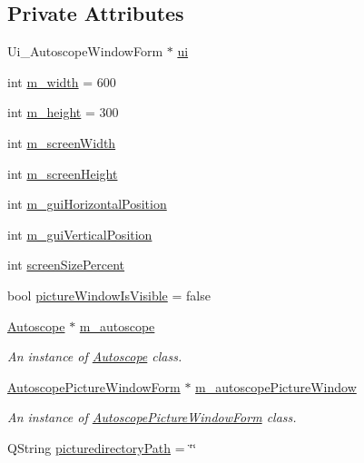 \subsection*{Private Attributes}
\begin{DoxyCompactItemize}
\item 
Ui\+\_\+\+Autoscope\+Window\+Form $\ast$ \mbox{\hyperlink{class_autoscope_window_form_a9a937e00b0a9a4d16001b5da7449a07f}{ui}}
\item 
int \mbox{\hyperlink{class_autoscope_window_form_a494735b51d06bfa71d5954da50f51d3d}{m\+\_\+width}} = 600
\item 
int \mbox{\hyperlink{class_autoscope_window_form_a6dbb17c9dce12f2a8775e1510b0139e9}{m\+\_\+height}} = 300
\item 
int \mbox{\hyperlink{class_autoscope_window_form_a6a4204832945288b420ae248dc69ae08}{m\+\_\+screen\+Width}}
\item 
int \mbox{\hyperlink{class_autoscope_window_form_a60c88c0b6f8f7f5eac46680a7b00b59e}{m\+\_\+screen\+Height}}
\item 
int \mbox{\hyperlink{class_autoscope_window_form_a729b0f3174ac22f142a78dbc6d2677be}{m\+\_\+gui\+Horizontal\+Position}}
\item 
int \mbox{\hyperlink{class_autoscope_window_form_abfd03b3848ab390f59cfe1778595bcb8}{m\+\_\+gui\+Vertical\+Position}}
\item 
int \mbox{\hyperlink{class_autoscope_window_form_a4e436f5aca95b4d503ae9c5fe28ec8ed}{screen\+Size\+Percent}}
\item 
bool \mbox{\hyperlink{class_autoscope_window_form_a0a27bb2073810e25351a6dc773f128df}{picture\+Window\+Is\+Visible}} = false
\item 
\mbox{\hyperlink{class_autoscope}{Autoscope}} $\ast$ \mbox{\hyperlink{class_autoscope_window_form_a73df08489686c1d7f72d0e1d7f3bfee3}{m\+\_\+autoscope}}
\begin{DoxyCompactList}\small\item\em An instance of \mbox{\hyperlink{class_autoscope}{Autoscope}} class. \end{DoxyCompactList}\item 
\mbox{\hyperlink{class_autoscope_picture_window_form}{Autoscope\+Picture\+Window\+Form}} $\ast$ \mbox{\hyperlink{class_autoscope_window_form_a859556308e579b3c83862e943684f859}{m\+\_\+autoscope\+Picture\+Window}}
\begin{DoxyCompactList}\small\item\em An instance of \mbox{\hyperlink{class_autoscope_picture_window_form}{Autoscope\+Picture\+Window\+Form}} class. \end{DoxyCompactList}\item 
Q\+String \mbox{\hyperlink{class_autoscope_window_form_a2e8d5a43841204d931654d255e194e60}{picturedirectory\+Path}} = \char`\"{}\char`\"{}
\end{DoxyCompactItemize}


